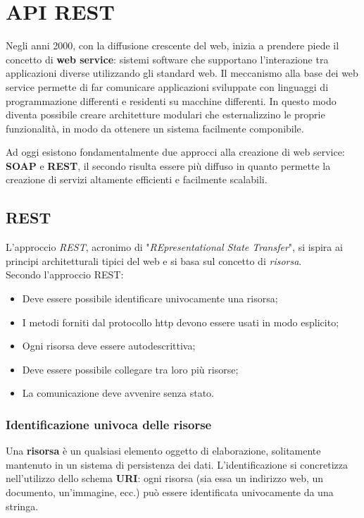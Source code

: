 
\chapter{API REST}
Negli anni 2000, con la diffusione crescente del web, inizia a prendere piede il concetto di \textbf{web service}: sistemi software che supportano l'interazione tra applicazioni diverse utilizzando gli standard web. Il meccanismo alla base dei web service permette di far comunicare applicazioni sviluppate con linguaggi di programmazione differenti e residenti su macchine differenti. In questo modo diventa possibile creare architetture modulari che esternalizzino le proprie funzionalità, in modo da ottenere un sistema facilmente componibile. \bigskip

Ad oggi esistono fondamentalmente due approcci alla creazione di web service: \textbf{SOAP} e \textbf{REST}, il secondo risulta essere più diffuso in quanto permette la creazione di servizi altamente efficienti e facilmente scalabili.

\section{REST}
L'approccio \textit{REST}, acronimo di "\textit{REpresentational State Transfer}", si ispira ai principi architetturali tipici del web e si basa sul concetto di \textit{risorsa}. \\
Secondo l'approccio REST:

\begin{itemize}
	\item Deve essere possibile identificare univocamente una risorsa;
	\item I metodi forniti dal protocollo \gls{http}\glsfirstoccur{} devono essere usati in modo esplicito;
	\item Ogni risorsa deve essere autodescrittiva;
	\item Deve essere possibile collegare tra loro più risorse;
	\item La comunicazione deve avvenire senza stato.
\end{itemize}

\subsection{Identificazione univoca delle risorse}
Una \textbf{risorsa} è un qualsiasi elemento oggetto di elaborazione, solitamente mantenuto in un sistema di persistenza dei dati.
L'identificazione si concretizza nell'utilizzo dello schema \textbf{URI}: ogni risorsa (sia essa un indirizzo web, un documento, un'immagine, ecc.) può essere identificata univocamente da una stringa. \bigskip

